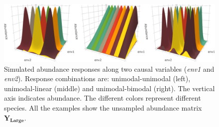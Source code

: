 \documentclass[a4paper,11pt]{article}
\begin{document}
		\begin{figure}[ht]
		    \begin{center}
		        \includegraphics[width = 1\linewidth]{figure1_simulated_communities}   
			   	\caption{
			                Simulated abundance responses along two causal variables (\textit{env1} and \textit{env2}). 
                            Response combinations are: unimodal-unimodal (left), unimodal-linear (middle) and unimodal-bimodal (right). 
                			The vertical axis indicates abundance. 
                			The different colors represent different species.
                			All the examples show the unsampled abundance matrix
                			$\mathbf{Y_{Large}}$.
			            }
			    \label{fig:bivariateExample} 
			\end{center}
        \end{figure}
        
\end{document}
